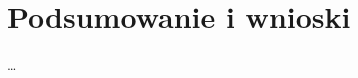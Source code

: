 \documentclass[lic,declaration,shortabstract]{iithesis}
\author         {Jakub Mendyk}
\date          {4 września 2020}                     %
\theoremstyle{definition} \newtheorem{definition}{Definition}[chapter]
\begin{document}











\chapter{Podsumowanie i wnioski}

\ldots


\nocite{biernacki2017handle}
\nocite{biernacki2019abstracting}
\nocite{biernacki2019binders}
\nocite{pietersgeneralized}
\nocite{mcbride2012frank}



\end{document}

